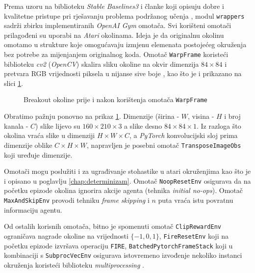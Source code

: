 Prema uzoru na biblioteku \textit{Stable Baselines3} i članke koji opisuju dobre i kvalitetne pristupe pri rješavanju problema podržanog učenja \cite{DQL}, modul \texttt{wrappers} sadrži zbirku implementiranih \textit{OpenAI Gym} omotača. Svi korišteni omotači prilagođeni su uporabi na \textit{Atari} okolinama. Ideja je da originalnu okolinu omotamo u strukture koje omogućavaju izmjenu elemenata postojećeg okruženja bez potrebe za mijenjanjem originalnog koda. Omotač \texttt{WarpFrame} koristeći biblioteku \textit{cv2} (\textit{OpenCV}) skalira sliku okoline na okvir dimenzija $84 \times 84$ i pretvara RGB vrijednosti piksela u nijanse sive boje , kao što je i prikazano na slici \ref{fig:warp-frame}.

\begin{figure}[H]
    \centering
    \caption{Breakout okoline prije i nakon korištenja omotača \texttt{WarpFrame}}
    \label{fig:warp-frame}
\end{figure}

Obratimo pažnju ponovno na prikaz \ref{fig:warp-frame}. Dimenzije (širina - $W$, visina - $H$ i broj kanala - $C$) slike lijevo su $160 \times 210 \times 3$ a slike desno $84 \times 84 \times 1$. Iz razloga što okolina vraća slike u dimenziji $H \times W \times C$, a \textit{PyTorch} konvolucijski sloj prima dimenzije oblike $C \times H \times W$, napravljen je posebni omotač \texttt{TransposeImageObs} koji uređuje dimenzije.

Omotači mogu poslužiti i za ugrađivanje stohastike u atari okruženjima kao što je i opisano u poglavlju \ref{chap:determinizam}. Omotač \texttt{NoopResetEnv} osigurava da na početku epizode okolina ignorira akcije agenta (tehnika \textit{initial no-ops}). Omotač \texttt{MaxAndSkipEnv} provodi tehniku \textit{frame skipping} i $n$ puta vraća istu povratnu informaciju agentu. 

Od ostalih korisnih omotača, bitno je spomenuti omotač \texttt{ClipRewardEnv} ograničava nagrade okoline na vrijednosti $ \{ -1, 0, 1 \} $, \texttt{FireResetEnv} koji na početku epizode izvršava operaciju \texttt{FIRE}, \texttt{BatchedPytorchFrameStack} koji u kombinaciji s \texttt{SubprocVecEnv} osigurava istovremeno izvođenje nekoliko instanci okruženja koristeći biblioteku \textit{multiprocessing} \cite{SB3}.

